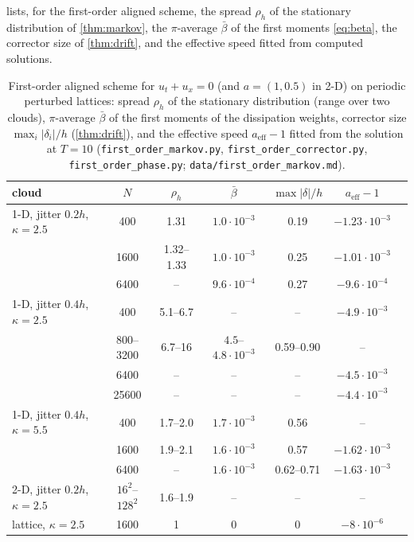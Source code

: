 \documentclass[11pt,a4paper]{article}
\theoremstyle{plain}
\theoremstyle{definition}
\theoremstyle{remark}
\numberwithin{equation}{section}
\begin{document}
 lists, for the first-order aligned scheme, the spread $\rho_h$ of the stationary distribution of \cref{thm:markov}, the $\pi$-average $\bar\beta$ of the first moments \eqref{eq:beta}, the corrector size of \cref{thm:drift}, and the effective speed fitted from computed solutions.

\begin{table}[t]
\centering
\caption{First-order aligned scheme for $u_t+u_x=0$ (and $a=(1,0.5)$ in 2-D) on periodic perturbed lattices: spread $\rho_h$ of the stationary distribution (range over two clouds), $\pi$-average $\bar\beta$ of the first moments of the dissipation weights, corrector size $\max_i|\delta_i|/h$ (\cref{thm:drift}), and the effective speed $a_{\mathrm{eff}}-1$ fitted from the solution at $T=10$ (\texttt{first\_order\_markov.py}, \texttt{first\_order\_corrector.py}, \texttt{first\_order\_phase.py}; \texttt{data/first\_order\_markov.md}).}\label{tab:markov}
\small
\begin{tabular}{lcccccc}
\toprule
cloud & $N$ & $\rho_h$ & $\bar\beta$ & $\max|\delta|/h$ & $a_{\mathrm{eff}}-1$\\
\midrule
1-D, jitter $0.2h$, $\kappa=2.5$ & 400 & 1.31 & $1.0\cdot10^{-3}$ & 0.19 & $-1.23\cdot10^{-3}$\\
 & 1600 & 1.32--1.33 & $1.0\cdot10^{-3}$ & 0.25 & $-1.01\cdot10^{-3}$\\
 & 6400 & -- & $9.6\cdot10^{-4}$ & 0.27 & $-9.6\cdot10^{-4}$\\
1-D, jitter $0.4h$, $\kappa=2.5$ & 400 & 5.1--6.7 & -- & -- & $-4.9\cdot10^{-3}$\\
 & 800--3200 & 6.7--16 & $4.5$--$4.8\cdot10^{-3}$ & 0.59--0.90 & --\\
 & 6400 & -- & -- & -- & $-4.5\cdot10^{-3}$\\
 & 25600 & -- & -- & -- & $-4.4\cdot10^{-3}$\\
1-D, jitter $0.4h$, $\kappa=5.5$ & 400 & 1.7--2.0 & $1.7\cdot10^{-3}$ & 0.56 & --\\
 & 1600 & 1.9--2.1 & $1.6\cdot10^{-3}$ & 0.57 & $-1.62\cdot10^{-3}$\\
 & 6400 & -- & $1.6\cdot10^{-3}$ & 0.62--0.71 & $-1.63\cdot10^{-3}$\\
2-D, jitter $0.2h$, $\kappa=2.5$ & $16^2$--$128^2$ & 1.6--1.9 & -- & -- & --\\
lattice, $\kappa=2.5$ & 1600 & 1 & 0 & 0 & $-8\cdot10^{-6}$\\
\bottomrule
\end{tabular}
\end{table}
\end{document}
